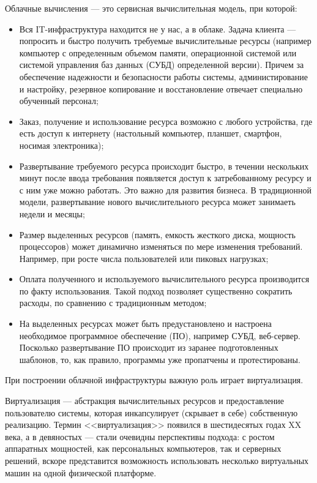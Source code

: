 
Облачные вычисления --- это сервисная вычислительная модель, при которой:
\begin{itemize}
  \item Вся IT-инфраструктура находится не у нас, а в облаке.
  Задача клиента --- попросить и быстро получить требуемые вычислительные ресурсы (например компьютер с определенным объемом памяти, операционной системой или системой управления баз данных (СУБД) определенной версии).
  Причем за обеспечение надежности и безопасности работы системы, администирование и настройку, резервное копирование и восстановление отвечает специально обученный персонал;
  \item Заказ, получение и использование ресурса возможно с любого устройства, где есть доступ к интернету (настольный компьютер, планшет, смартфон, носимая электроника);
  \item Развертывание требуемого ресурса происходит быстро, в течении нескольких минут после ввода требования появляется доступ к затребованному ресурсу и с ним уже можно работать.
  Это важно для развития бизнеса.
  В традиционной модели, развертывание нового вычислительного ресурса может занимаеть недели и месяцы;
  \item Размер выделенных ресурсов (память, емкость жесткого диска, мощность процессоров) может динамично изменяться по мере изменения требований.
  Например, при росте числа пользователей или пиковых нагрузках;
  \item Оплата полученного и используемого вычислительного ресурса производится по факту использования.
  Такой подход позволяет существенно сократить расходы, по сравнению с традиционным методом;
  \item На выделенных ресурсах может быть предустановлено и настроена необходимое программное обеспечение (ПО), например СУБД, веб-сервер.
  Посколько развертывание ПО происходит из заранее подготовленных шаблонов, то, как правило, программы уже пропатчены и протестированы.
\end{itemize}

При построении облачной инфраструктуры важную роль играет виртуализация.

Виртуализация --- абстракция вычислительных ресурсов и предоставление пользователю системы, которая инкапсулирует (скрывает в себе) собственную реализацию.
Термин <<виртуализация>> появился в шестидесятых годах XX века, а в девяностых --- стали очевидны перспективы подхода: с ростом аппаратных мощностей, как персональных компьютеров, так и серверных решений, вскоре представится возможность использовать несколько виртуальных машин на одной физической платформе.

